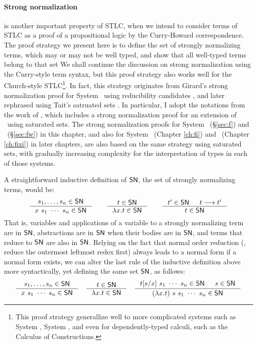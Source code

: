\paragraph{Strong normalization} is another important property of STLC,
when we intend to consider terms of STLC as a proof of a propositional logic
by the Curry-Howard correspondence. The proof strategy we present here is
to define the set of strongly normalizing terms, which may or may not be
well typed, and show that all well-typed terms belong to that set
We shall continue the discussion on strong normalization using
the Curry-style term syntax, but this proof strategy also works well
for the Church-style STLC\footnote{This proof strategy generallize well
	to more complicated systems such as System \F, System \Fw, and
	even for dependently-typed calculi, such as
	the Calculus of Constructions\cite{Geuvers94}.}.
In fact, this strategy originates from Girard's strong normalization proof
for System \F\ using reducibility candidates \cite{Gir71}, and later rephrased
using Tait's satruated sets \cite{Tait75}. In particular, I adopt
the notations from the work of \citet{AbeMat04}, which includes
a strong normalization proof for an extension of \Fw\ using saturated sets.
The strong normalization proofs for System \F\ (\S\ref{sec:f}) and
\Fw\ (\S\ref{sec:fw}) in this chapter, and also for System \Fi\
(Chapter \ref{ch:fi}) and \Fixi\ (Chapter \ref{ch:fixi}) in later chapters,
are also based on the same strategy using saturated sets, with gradually
increasing complexity for the interpretation of types in each of those systems.

A straightforward inductive definition of $\mathsf{SN}$,
the set of strongly normalizing terms, would be:
\[
\inference{s_1,\ldots,s_n\in\SN}{x~s_1~\cdots~s_n \in \SN}
\qquad
\inference{t \in \SN}{\l x.t \in \SN}
\qquad
\inference{t' \in \SN & t --> t'}{t \in \SN}
\]
That is, variables and applications of a variable to a strongly normalizing term
are in $\mathsf{SN}$, abstractions are in $\mathsf{SN}$ when their bodies are in $\mathsf{SN}$,
and terms that reduce to $\mathsf{SN}$ are also in $\mathsf{SN}$. Relying on the fact that
normal order reduction (\ie, reduce the outermost leftmost redex first) always
leads to a normal form if a normal form exists, we can alter the last rule of
the inductive definition above more syntactically, yet defining the same set
$\mathsf{SN}$, as follows:
\[
\inference{s_1,\ldots,s_n\in\SN}{x~s_1~\cdots~s_n \in \SN}
\quad
\inference{t \in \SN}{\l x.t \in \SN}
\quad
\inference{t[s/x]~s_1~\cdots~s_n\in \SN & s\in\SN}
	{(\lambda x.t)~s~s_1~\cdots~s_n \in \SN}
\]

